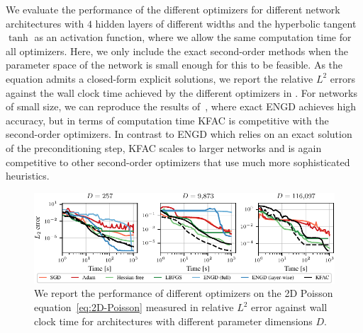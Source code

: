 We evaluate the performance of the different optimizers for different network architectures with $4$ hidden layers of different widths and the hyperbolic tangent $\tanh$ as an activation function, where we allow the same computation time for all optimizers. 
Here, we only include the exact second-order methods when the parameter space of the network is small enough for this to be feasible.
As the equation admits a closed-form explicit solutions, we report the relative $L^2$ errors against the wall clock time achieved by the different optimizers in . 
For networks of small size, we can reproduce the results of~\cite{muller2023achieving}, where exact ENGD achieves high accuracy, but in terms of computation time KFAC is competitive with the second-order optimizers. 
In contrast to ENGD which relies on an exact solution of the preconditioning step, KFAC scales to larger networks and is again competitive to other second-order optimizers that use much more sophisticated heuristics. 
\begin{figure}[t]
    \centering
    \includegraphics{../kfac_pinns_exp/exp17_groupplot_poisson2d/l2_error_over_time.pdf}
    \caption{We report the performance of different optimizers on the 2D Poisson equation~\eqref{eq:2D-Poisson} measured in relative $L^2$ error against wall clock time for architectures with different parameter dimensions $D$.}
    \label{fig:2D-Poisson}
\end{figure}
